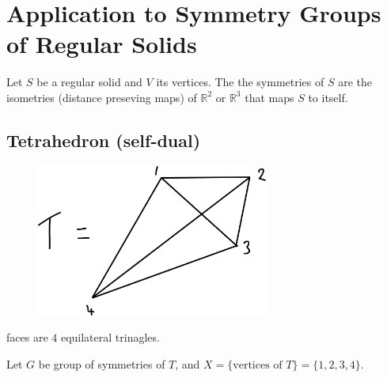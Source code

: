 \section{Application to Symmetry Groups of Regular Solids}
Let $S$ be a regular solid and $V$ its vertices.
The the symmetries of $S$ are the isometries (distance preseving maps) of $\mathbb{R}^2$ or $\mathbb{R}^3$ that maps $S$ to itself.

\subsection{Tetrahedron (self-dual)}

\begin{figure}
    \centering 
    \includegraphics[height=5cm]{figures/07-tetrahedron}
\end{figure} faces are $4$ equilateral trinagles.

Let $G$ be group of symmetries of $T$, and $X = \{\text{vertices of } T\} = \{1, 2, 3, 4\}$.